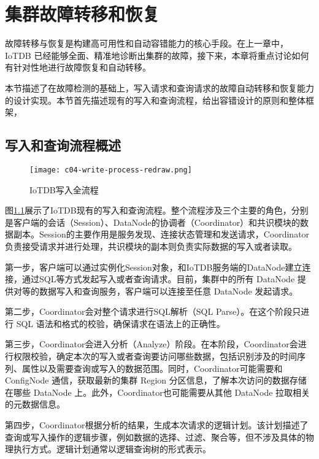 
\chapter{集群故障转移和恢复}

故障转移与恢复是构建高可用性和自动容错能力的核心手段。在上一章中，IoTDB 已经能够全面、精准地诊断出集群的故障，接下来，本章将重点讨论如何有针对性地进行故障恢复和自动转移。

本节描述了在故障检测的基础上，写入请求和查询请求的故障自动转移和恢复能力的设计实现。本节首先描述现有的写入和查询流程，给出容错设计的原则和整体框架，

\section{写入和查询流程概述}

\begin{figure}
  \centering
  \texttt{[image: c04-write-process-redraw.png]}
  \caption{IoTDB写入全流程}
  \label{fig:c04-write-process}
\end{figure}

图\ref{fig:c04-write-process}展示了IoTDB现有的写入和查询流程。整个流程涉及三个主要的角色，分别是客户端的会话（Session）、DataNode的协调者（Coordinator）和共识模块的数据副本。Session的主要作用是服务发现、连接状态管理和发送请求，Coordinator负责接受请求并进行处理，共识模块的副本则负责实际数据的写入或者读取。

第一步，客户端可以通过实例化Session对象，和IoTDB服务端的DataNode建立连接，通过SQL等方式发起写入或者查询请求。目前，集群中的所有 DataNode 提供对等的数据写入和查询服务，客户端可以连接至任意 DataNode 发起请求。

第二步，Coordinator会对整个请求进行SQL解析（SQL Parse）。在这个阶段只进行 SQL 语法和格式的校验，确保请求在语法上的正确性。

第三步，Coordinator会进入分析（Analyze）阶段。在本阶段，Coordinator会进行权限校验，确定本次的写入或者查询要访问哪些数据，包括识别涉及的时间序列、属性以及需要查询或写入的数据范围。同时，Coordinator可能需要和ConfigNode 通信，获取最新的集群 Region 分区信息，了解本次访问的数据存储在哪些 DataNode 上。此外，Coordinator也可能需要从其他 DataNode 拉取相关的元数据信息。

第四步，Coordinator根据分析的结果，生成本次请求的逻辑计划。该计划描述了查询或写入操作的逻辑步骤，例如数据的选择、过滤、聚合等，但不涉及具体的物理执行方式。逻辑计划通常以逻辑查询树的形式表示。

